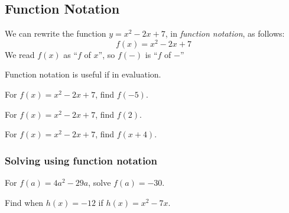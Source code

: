 \subsection{Function Notation}

\begin{example}
We can rewrite the function $y=x^2-2x+7$, in \emph{function notation},
as follows:
\[
f(x)=x^2-2x+7
\]
We read $f(x)$ as ``$f$ of $x$'', so $f(-)$ is ``$f$ of $-$''
\end{example}

Function notation is useful if in evaluation.

\begin{exercise}
For $f(x)=x^2-2x+7$, find $f(-5)$.
\end{exercise}
\begin{solution}[1in]

\end{solution}

\begin{exercise}
For $f(x)=x^2-2x+7$, find $f(2)$.
\end{exercise}
\begin{solution}[2in]

\end{solution}

\begin{exercise}
For $f(x)=x^2-2x+7$, find $f(x+4)$.
\end{exercise}
\begin{solution}[2in]

\end{solution}

\subsubsection*{Solving using function notation}

\begin{exercise}
For $f(a)=4a^2-29a$, solve $f(a)=-30$.
\end{exercise}
\begin{solution}[2.5in]

\end{solution}

\newpage

\begin{exercise}
Find when $h(x)=-12$ if $h(x)=x^2-7x$.
\end{exercise}
\begin{solution}[2in]

\end{solution}


